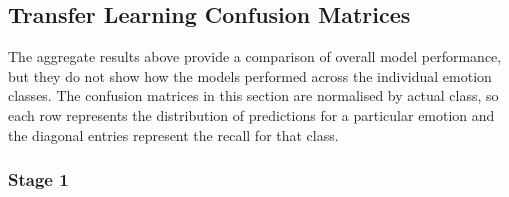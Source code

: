 \documentclass[12pt, a4paper]{report}
\let\oldsubsection\subsection
\renewcommand{\subsection}{%
    \Needspace{6\baselineskip}%
    \oldsubsection
}
\let\oldsubsubsection\subsubsection
\renewcommand{\subsubsection}{%
    \Needspace{6\baselineskip}%
    \oldsubsubsection
}
\begin{document}
			\subsection{Transfer Learning Confusion Matrices}
				
				The aggregate results above provide a comparison of overall model performance, but they do not show how the models performed across the individual emotion classes. The confusion matrices in this section are normalised by actual class, so each row represents the distribution of predictions for a particular emotion and the diagonal entries represent the recall for that class.
				
				\subsubsection{Stage 1}
					
\end{document}
